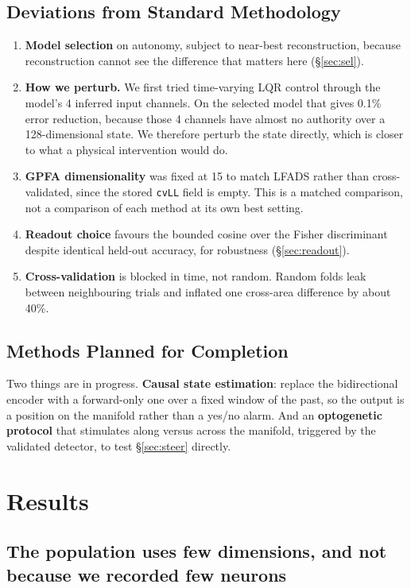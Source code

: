 \documentclass[11pt]{article}
\begin{document}
\subsection{Deviations from Standard Methodology}\label{sec:dev}

\begin{enumerate}
\item \textbf{Model selection} on autonomy, subject to near-best reconstruction,
because reconstruction cannot see the difference that matters here
(\S\ref{sec:sel}).
\item \textbf{How we perturb.} We first tried time-varying LQR control through
the model's 4 inferred input channels. On the selected model that gives 0.1\%
error reduction, because those 4 channels have almost no authority over a
128-dimensional state. We therefore perturb the state directly, which is closer
to what a physical intervention would do.
\item \textbf{GPFA dimensionality} was fixed at 15 to match LFADS rather than
cross-validated, since the stored \texttt{cvLL} field is empty. This is a matched
comparison, not a comparison of each method at its own best setting.
\item \textbf{Readout choice} favours the bounded cosine over the Fisher
discriminant despite identical held-out accuracy, for robustness
(\S\ref{sec:readout}).
\item \textbf{Cross-validation} is blocked in time, not random. Random folds leak
between neighbouring trials and inflated one cross-area difference by about 40\%.
\end{enumerate}

\subsection{Methods Planned for Completion}

Two things are in progress. \textbf{Causal state estimation}: replace the
bidirectional encoder with a forward-only one over a fixed window of the past, so
the output is a position on the manifold rather than a yes/no alarm. And an
\textbf{optogenetic protocol} that stimulates along versus across the manifold,
triggered by the validated detector, to test \S\ref{sec:steer} directly.

\section{Results}

\subsection{The population uses few dimensions, and not because we recorded few
neurons}\label{sec:lowd}
\end{document}
